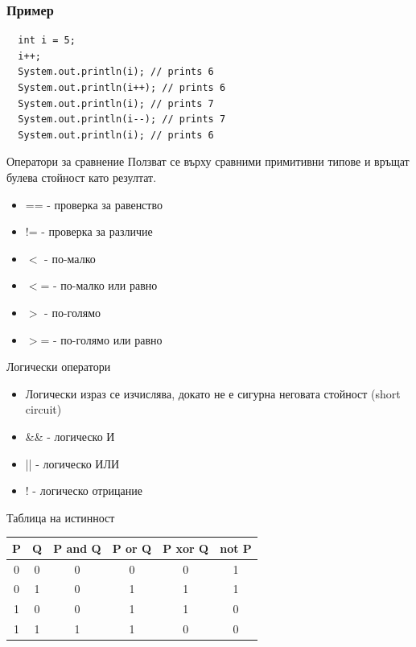 \documentclass{beamer}
\begin{document}
\begin{frame}[fragile]
  \frametitle{Пример}
  \transdissolve
\begin{lstlisting}
  int i = 5;
  i++;
  System.out.println(i); // prints 6
  System.out.println(i++); // prints 6
  System.out.println(i); // prints 7
  System.out.println(i--); // prints 7
  System.out.println(i); // prints 6
\end{lstlisting}
\end{frame}

\begin{frame}{Оператори за сравнение}
  \transdissolve
  Ползват се върху сравними примитивни
  типове и връщат булева стойност като резултат.
  
  \begin{itemize}
  \item == - проверка за равенство
  \item != - проверка за различие
  \item $<$  - по-малко
  \item $<$= - по-малко или равно
  \item $>$  - по-голямо
  \item $>$= - по-голямо или равно
  \end{itemize}
\end{frame}

\begin{frame}{Логически оператори}
  \transdissolve
  \begin{itemize}
  \item   Логически израз се изчислява, докато
    не е сигурна неговата стойност (short
    circuit)
  \item \&\& - логическо И
  \item || - логическо ИЛИ
  \item ! - логическо отрицание
  \end{itemize}
\end{frame}

\begin{frame}{Таблица на истинност}
  \transdissolve 
  \begin{tabular}{|c|c|c|c|c|c|}
    \hline
    P & Q & P and Q & P or Q & P xor Q & not P \\
    \hline
    0 & 0 & 0 & 0 & 0 & 1 \\
    \hline
    0 & 1 & 0 & 1 & 1 & 1 \\
    \hline
    1 & 0 & 0 & 1 & 1 & 0 \\
    \hline
    1 & 1 & 1 & 1 & 0 & 0 \\
    \hline
  \end{tabular} 
\end{frame}
\end{document}
